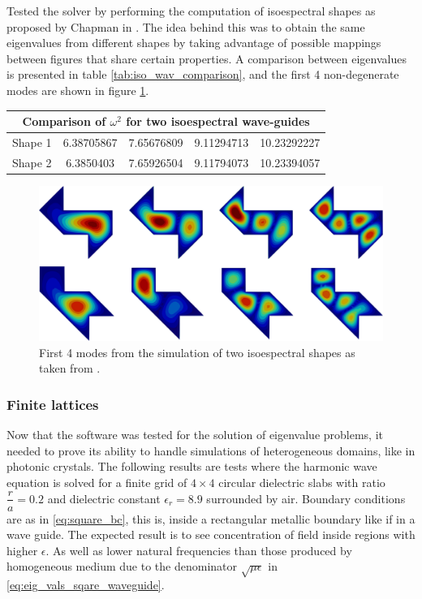 Tested the solver by performing the computation of isoespectral shapes as proposed by Chapman in \cite{Chapman1995}. The idea behind this was to obtain the same eigenvalues from different shapes by taking advantage of possible mappings between figures that share certain properties.
A comparison between eigenvalues is presented in table \ref{tab:iso_wav_comparison}, and the first 4 non-degenerate modes are shown in figure \ref{fig:isoespectral_waveguide}.
\begin{center}
\begin{tabular}{|c|c|c|c|c|}
\hline
\multicolumn{5}{|c|}{Comparison of $\omega^2$ for two isoespectral wave-guides} \\
\hline 
Shape 1  & 6.38705867 & 7.65676809 & 9.11294713 & 10.23292227 \\ 
\hline 
Shape 2 & 6.3850403 & 7.65926504 & 9.11794073 & 10.23394057 \\ 
\hline 
\end{tabular}
\label{tab:iso_wav_comparison}
\end{center}
\begin{figure}
\centering
\includegraphics[scale=0.1]{./img/isoespectral.pdf}
\caption{First 4 modes from the simulation of two isoespectral shapes as taken from \cite{Chapman1995}.}
\label{fig:isoespectral_waveguide}
\end{figure}

\subsubsection{Finite lattices}

Now that the software was tested for the solution of eigenvalue problems, it needed to prove its ability to handle simulations of heterogeneous domains, like in photonic crystals. The following results are tests where the harmonic wave equation is solved for a finite grid of $4\times 4$ circular dielectric slabs with ratio $\dfrac{r}{a}=0.2$ and dielectric constant $\epsilon_r = 8.9$ surrounded by air. Boundary conditions are as in \ref{eq:square_bc}, this is, inside a rectangular metallic boundary like if in a wave guide. The expected result is to see concentration of field inside regions with higher $\epsilon$. As well as lower natural frequencies than those produced by homogeneous medium due to the denominator $\sqrt{\mu\epsilon}$ in \ref{eq:eig_vals_sqare_waveguide}. 


